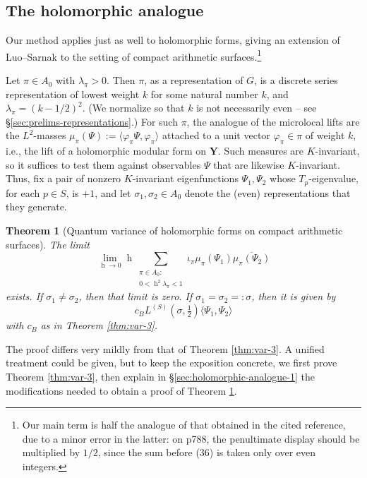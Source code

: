 \documentclass[reqno,10pt]{amsart}
\theoremstyle{plain} %
\newtheorem{theorem}             {Theorem}
\theoremstyle{definition}
\theoremstyle{plain} %
\theoremstyle{remark}
\theoremstyle{itplain} %
\theoremstyle{remark} %
\numberwithin{equation}{section}
\DeclareMathOperator{\h}{h}
\begin{document}
\subsection{The holomorphic analogue}\label{sec:holomorphic-analogue}
Our method applies just as well to holomorphic forms, giving an extension of Luo--Sarnak \cite[Thm 1]{MR2103474} to the setting of compact arithmetic surfaces.\footnote{  Our main term is half the analogue of that obtained in the cited reference, due to a minor error in the latter: on p788, the penultimate display should be multiplied by $1/2$, since the sum before (36) is taken only over even integers. }

Let $\pi \in A_0$ with $\lambda_\pi > 0$.  Then $\pi$, as a representation of $G$, is a discrete series representation of lowest weight $k$ for some natural number $k$, and $\lambda_\pi = (k-1/2)^2$.  (We normalize so that $k$ is not necessarily even -- see \S\ref{sec:prelims-representations}.)  For such $\pi$, the analogue of the microlocal lifts are the $L^2$-masses $\mu_\pi(\Psi) := \langle \varphi_\pi \Psi, \varphi_\pi \rangle$ attached to a unit vector $\varphi_\pi \in \pi$ of weight $k$, i.e., the lift of a holomorphic modular form on $\mathbf{Y}$.  Such measures are $K$-invariant, so it suffices to test them against observables $\Psi$ that are likewise $K$-invariant.  Thus, fix a pair of nonzero $K$-invariant eigenfunctions $\Psi_1, \Psi_2$ whose $T_p$-eigenvalue, for each $p \in S$, is $+1$, and let $\sigma_1, \sigma_2 \in A_0$ denote the (even) representations that they generate.
\begin{theorem}[Quantum variance of holomorphic forms on compact arithmetic surfaces]\label{thm:var-quat-annals-submission:limit-begin-lim_h}
  The limit
  \begin{equation*}
    \lim_{\h \rightarrow 0}
    \h
    \sum_{
      \substack{
        \pi \in A_0 : \\
        0 < \h^2 \lambda_\pi < 1
      }
    }
    \iota_{\pi}
    \mu_\pi(\Psi_1)
    \overline{\mu_\pi(\Psi_2)}
  \end{equation*}
  exists.  If $\sigma_1 \neq \sigma_2$, then that limit is zero.  If $\sigma_1 = \sigma_2 =: \sigma$, then it is given by
  \begin{equation*}
    c_B
    L^{(S)}(\sigma,\tfrac{1}{2})
    \langle \Psi_1, \Psi_2 \rangle
  \end{equation*}
  with $c_B$ as in Theorem \ref{thm:var-3}.
\end{theorem}

The proof differs very mildly from that of Theorem \ref{thm:var-3}. A unified treatment could be given, but to keep the exposition concrete, we first prove Theorem \ref{thm:var-3}, then explain in \S\ref{sec:holomorphic-analogue-1} the modifications needed to obtain a proof of Theorem \ref{thm:var-quat-annals-submission:limit-begin-lim_h}.
\end{document}
